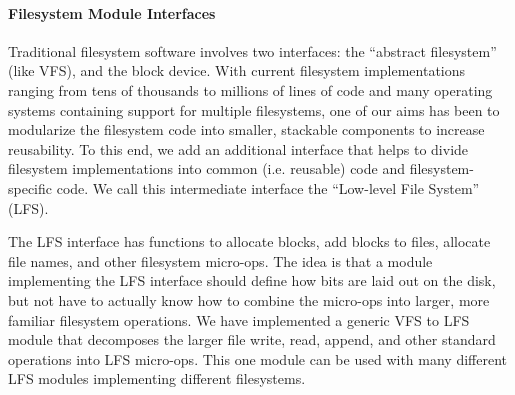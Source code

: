 \preparagraphspacing{}
\paragraph*{Filesystem Module Interfaces}
\label{sec:interfaces}

Traditional filesystem software involves two interfaces: the ``abstract
filesystem'' (like VFS), and the block device. With current filesystem
implementations ranging from tens of thousands to millions of lines of code
and many operating systems containing support for multiple filesystems, one of
our aims has been to modularize the filesystem code into smaller, stackable
components to increase reusability. To this end, we add an additional
interface that helps to divide filesystem implementations into common (i.e.
reusable) code and filesystem-specific code. We call this intermediate
interface the ``Low-level File System'' (LFS).

The LFS interface has functions to allocate blocks, add blocks to files,
allocate file names, and other filesystem micro-ops. The idea is that a module
implementing the LFS interface should define how bits are laid out on the
disk, but not have to actually know how to combine the micro-ops into larger,
more familiar filesystem operations. We have implemented a generic VFS to LFS
module that decomposes the larger file write, read, append, and other standard
operations into LFS micro-ops. This one module can be used with many different
LFS modules implementing different filesystems.
